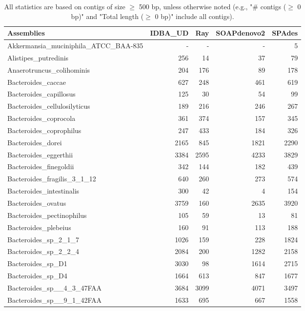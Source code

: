\documentclass[12pt,a4paper]{article}
\begin{document}
\begin{table}[ht]
\begin{center}
\caption{All statistics are based on contigs of size $\geq$ 500 bp, unless otherwise noted (e.g., "\# contigs ($\geq$ 0 bp)" and "Total length ($\geq$ 0 bp)" include all contigs).}
\begin{tabular}{|l*{4}{|r}|}
\hline
Assemblies & IDBA\_UD & Ray & SOAPdenovo2 & SPAdes \\ \hline
Akkermansia\_muciniphila\_ATCC\_BAA-835 & - & - & - & 5 \\ \hline
Alistipes\_putredinis & 256 & 14 & 37 & 79 \\ \hline
Anaerotruncus\_colihominis & 204 & 176 & 89 & 178 \\ \hline
Bacteroides\_caccae & 627 & 248 & 461 & 619 \\ \hline
Bacteroides\_capillosus & 125 & 30 & 54 & 99 \\ \hline
Bacteroides\_cellulosilyticus & 189 & 216 & 246 & 267 \\ \hline
Bacteroides\_coprocola & 361 & 374 & 157 & 345 \\ \hline
Bacteroides\_coprophilus & 247 & 433 & 184 & 326 \\ \hline
Bacteroides\_dorei & 2165 & 845 & 1821 & 2290 \\ \hline
Bacteroides\_eggerthii & 3384 & 2595 & 4233 & 3829 \\ \hline
Bacteroides\_finegoldii & 342 & 144 & 182 & 439 \\ \hline
Bacteroides\_fragilis\_3\_1\_12 & 640 & 260 & 273 & 574 \\ \hline
Bacteroides\_intestinalis & 300 & 42 & 4 & 154 \\ \hline
Bacteroides\_ovatus & 3759 & 160 & 2635 & 3920 \\ \hline
Bacteroides\_pectinophilus & 105 & 59 & 13 & 81 \\ \hline
Bacteroides\_plebeius & 160 & 91 & 113 & 188 \\ \hline
Bacteroides\_sp\_2\_1\_7 & 1026 & 159 & 228 & 1824 \\ \hline
Bacteroides\_sp\_2\_2\_4 & 2084 & 200 & 1282 & 2158 \\ \hline
Bacteroides\_sp\_D1 & 3030 & 98 & 1614 & 2715 \\ \hline
Bacteroides\_sp\_D4 & 1664 & 613 & 847 & 1677 \\ \hline
Bacteroides\_sp\_\_4\_3\_47FAA & 3684 & 3099 & 4071 & 3497 \\ \hline
Bacteroides\_sp\_\_9\_1\_42FAA & 1633 & 695 & 667 & 1558 \\ \hline

\end{tabular}
\end{center}
\end{table}
\end{document}
